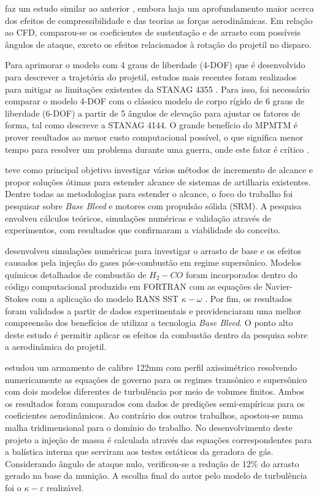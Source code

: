 \citeauthor{Sor2012Nov} faz um estudo similar ao anterior \cite{torangatti2basawaraj}, embora haja um aprofundamento maior acerca dos efeitos de compressibilidade e das teorias as forças aerodinâmicas. Em relação ao CFD, comparou-se os coeficientes de sustentação e de arrasto com possíveis ângulos de ataque, exceto os efeitos relacionados à rotação do projetil no disparo.

Para aprimorar o modelo com 4 graus de liberdade (4-DOF) que é desenvolvido para descrever a trajetória do projetil, estudos mais recentes foram realizados para mitigar as limitações existentes da STANAG 4355 \cite{Baranowski2013-1,Baranowski2013-2,Baranowski2013-3}. Para isso, foi necessário comparar o modelo 4-DOF com o clássico modelo de corpo rígido de 6 graus de liberdade (6-DOF) a partir de 5 ângulos de elevação para ajustar os fatores de forma, tal como descreve a STANAG 4144. O grande benefício do MPMTM é prover resultados ao menor custo computacional possível, o que significa menor tempo para resolver um problema durante uma guerra, onde este fator é crítico \cite{Baranowski2013-2}.

\citeauthor{Jelic2016Aug} teve como principal objetivo investigar vários métodos de incremento de alcance e propor soluções ótimas para estender alcance de sistemas de artilharia existentes. Dentre todas as metodologias para estender o alcance, o foco do trabalho foi pesquisar sobre \textit{Base Bleed} e motores com propulsão sólida (SRM). A pesquisa envolveu cálculos teóricos, simulações numéricas e validação através de experimentos, com resultados que confirmaram a viabilidade do conceito. 
	
\citeauthor{Xue2016Oct} desenvolveu simulações numéricas para investigar o arrasto de base e os efeitos causados pela injeção do gases pós-combustão em regime supersônico. Modelos químicos detalhados de combustão de $H_{2}-CO$ foram incorporados dentro do código computacional produzido em FORTRAN com as equações de Navier-Stokes com a aplicação do modelo RANS SST $\kappa-\omega$ \cite{Menter1994TwoequationET}. Por fim, os resultados foram validados a partir de dados experimentais e providenciaram uma melhor compreensão dos benefícios de utilizar a tecnologia \textit{Base Bleed}. O ponto alto deste estudo é permitir aplicar os efeitos da combustão dentro da pesquisa sobre a aerodinâmica do projetil. 
	
\citeauthor{belaidouni2016} estudou um armamento de calibre 122mm com perfil axissimétrico resolvendo numericamente as equações de governo para os regimes transônico e supersônico com dois modelos diferentes de turbulência por meio de volumes finitos. Ambos os resultados foram comparados com dados de predições semi-empíricas para os coeficientes aerodinâmicos. Ao contrário dos outros trabalhos, apostou-se numa malha tridimensional para o domínio do trabalho. No desenvolvimento deste projeto a injeção de massa é calculada através das equações correspondentes para a balística interna que serviram aos testes estáticos da geradora de gás. Considerando ângulo de ataque nulo, verificou-se a redução de 12\% do arrasto gerado na base da munição. A escolha final do autor pelo modelo de turbulência foi o $\kappa-\varepsilon$ realizável.
	
